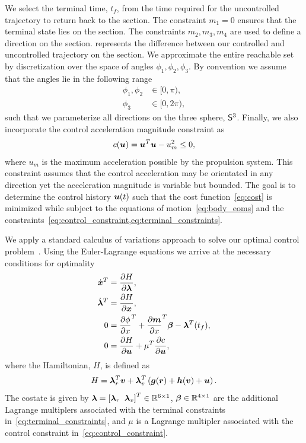 \documentclass[]{aiaa-tc}%
\begin{document}
We select the terminal time, \( t_f \), from the time required for the uncontrolled trajectory to return back to the \Poincare section.
The constraint \( m_1 = 0 \) ensures that the terminal state lies on the \Poincare section.
The constraints \( m_2, m_3, m_4 \) are used to define a direction on the \Poincare section.
 represents the difference between our controlled and uncontrolled trajectory on the \Poincare section.
We approximate the entire reachable set by discretization  over the space of angles \(\phi_1, \phi_2, \phi_3 \).
By convention we assume that the angles lie in the following range
\begin{align*}
    \phi_1, \phi_2 &\in [ 0, \pi ) ,\\
    \phi_3 &\in [ 0 , 2 \pi ) ,
\end{align*}
such that we parameterize all directions on the three sphere, \(\S^3\).
Finally, we also incorporate the control acceleration magnitude constraint as
\begin{align}\label{eq:control_constraint}
    c(\vecbf{u}) = \vecbf{u}^T \vecbf{u} - u_m^2 \leq 0 ,
\end{align}
where \( u_m \) is the maximum acceleration possible by the propulsion system.
This constraint assumes that the control acceleration may be orientated in any direction yet the acceleration magnitude is variable but bounded.
The goal is to determine the control history \( \vecbf{u}(t) \) such that the cost function~\cref{eq:cost} is minimized while subject to the equations of motion~\cref{eq:body_eoms} and the constraints~\cref{eq:control_constraint,eq:terminal_constraints}.

We apply a standard calculus of variations approach to solve our optimal control problem~\cite{bryson1975}.
Using the Euler-Lagrange equations we arrive at the necessary conditions for optimality
\begin{align}\label{eq:necc_conditions}
    \begin{split}
        \dot{\vecbf{x}} ^T &= \deriv{H}{\vecbf{\lambda}} ,\\
        \dot{\vecbf{\lambda}}^T &= \deriv{H}{\vecbf{x}} , \\
        0 &= \deriv{\phi}{x}^T + \deriv{\vecbf{m}}{x}^T \vecbf{\beta} - \vecbf{\lambda}^T(t_f) , \\
        0 &= \deriv{H}{\vecbf{u}} + \mu^T \deriv{c}{\vecbf{u}} ,
    \end{split}
\end{align}
where the Hamiltonian, \( H\), is defined as
\begin{align}\label{eq:hamiltonian}
    H = \vecbf{\lambda}_r^T \vecbf{v} + \vecbf{\lambda}_v^T \parenth{\vecbf{g}(\vecbf{r}) + \vecbf{h}(\vecbf{v}) + \vecbf{u}}.
\end{align}
The costate is given by \( \vecbf{\lambda} = \bracket{ \vecbf{\lambda}_r~\> \vecbf{\lambda}_v }^T \in \R^{6 \times 1}\), \( \vecbf{\beta} \in \R^{4 \times 1} \) are the additional Lagrange multiplers associated with the terminal constraints in~\cref{eq:terminal_constraints}, and \( \mu \) is a Lagrange multipler associated with the control constraint in~\cref{eq:control_constraint}.
\end{document}
